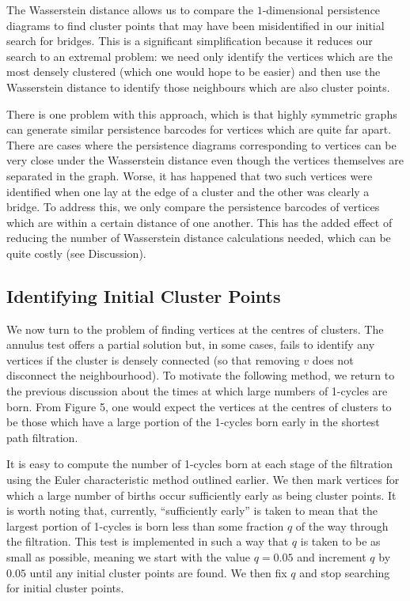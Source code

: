 \documentclass[12pt,a4paper]{amsart}
\numberwithin{equation}{section}
\theoremstyle{plain}
\theoremstyle{definition}
\begin{document}
\newpage

The Wasserstein distance allows us to compare the $1$-dimensional persistence diagrams to find cluster points that may have been misidentified in our initial search for bridges. This is a significant simplification because it reduces our search to an extremal problem: we need only identify the vertices which are the most densely clustered (which one would hope to be easier) and then use the Wasserstein distance to identify those neighbours which are also cluster points. 

There is one problem with this approach, which is that highly symmetric graphs can generate similar persistence barcodes for vertices which are quite far apart. There are cases where the persistence diagrams corresponding to vertices can be very close under the Wasserstein distance even though the vertices themselves are separated in the graph. Worse, it has happened that two such vertices were identified when one lay at the edge of a cluster and the other was clearly a bridge. To address this, we only compare the persistence barcodes of vertices which are within a certain distance of one another. This has the added effect of reducing the number of Wasserstein distance calculations needed, which can be quite costly (see Discussion).

\subsection{Identifying Initial Cluster Points}

We now turn to the problem of finding vertices at the centres of clusters. The annulus test offers a partial solution but, in some cases, fails to identify any vertices if the cluster is densely connected (so that removing $v$ does not disconnect the neighbourhood). To motivate the following method, we return to the previous discussion about the times at which large numbers of 1-cycles are born. From Figure 5, one would expect the vertices at the centres of clusters to be those which have a large portion of the 1-cycles born early in the shortest path filtration. 

It is easy to compute the number of 1-cycles born at each stage of the filtration using the Euler characteristic method outlined earlier. We then mark vertices for which a large number of births occur sufficiently early as being cluster points. It is worth noting that, currently, ``sufficiently early'' is taken to mean that the largest portion of 1-cycles is born less than some fraction $q$ of the way through the filtration. This test is implemented in such a way that $q$ is taken to be as small as possible, meaning we start with the value $q=0.05$ and increment $q$ by $0.05$ until any initial cluster points are found. We then fix $q$ and stop searching for initial cluster points.
\end{document}
